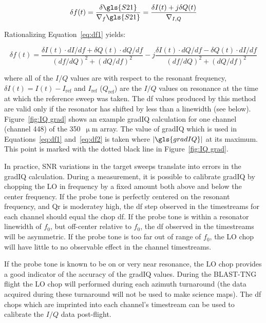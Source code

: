 \begin{equation}\label{eq:df1}
   \delta f(t) = \frac{\delta \gls{S21}}{\nabla_{f}\gls{S21}} = \frac{\delta I(t) + j\delta Q(t)}{\nabla_{I,Q}}
\end{equation}

Rationalizing Equation~\ref{eq:df1} yields:

\begin{equation}\label{eq:df2}
    \delta f(t) = \frac{\delta I(t) \cdot dI/df + \delta Q(t) \cdot dQ/df}{(df/dQ)^{2} + (dQ/df)^{2}} - j\frac{\delta I(t) \cdot dQ/df - \delta Q(t) \cdot dI/df}{(df/dQ)^{2} + (dQ/df)^{2}}
\end{equation}

where all of the $I/Q$ values are with respect to the resonant frequency, $\delta I(t) = I(t) - I_{\mathrm{ref}}$ and $I_{\mathrm{ref}}$ ($Q_{\mathrm{ref}}$) are the $I/Q$ values on resonance at the time at which the reference sweep was taken. The \gls{df} values produced by this method are valid only if the resonator has shifted by less than a linewidth (see below). Figure~\ref{fig:IQ grad} shows an example \gls{gradIQ} calculation for one channel (channel 448) of the 350~$\upmu$m array. The value of \gls{gradIQ} which is used in Equations~\ref{eq:df1} and~\ref{eq:df2} is taken where $\left| \gls{gradIQ} \right|$ at its maximum. This point is marked with the dotted black line in Figure~\ref{fig:IQ grad}.

In practice, SNR variations in the target sweeps translate into errors in the \gls{gradIQ} calculation. During a measurement, it is possible to calibrate \gls{gradIQ} by chopping the LO in frequency by a fixed amount both above and below the center frequency. If the probe tone is perfectly centered on the resonant frequency, and \gls{Qr} is moderatey high, the \gls{df} step observed in the timestreams for each channel should equal the chop \gls{df}. If the probe tone is within a resonator linewidth of $f_{0}$, but off-center relative to $f_{0}$, the \gls{df} observed in the timestreams will be asymmetric. If the probe tone is too far out of range of $f_{0}$, the LO chop will have little to no observable effect in the channel timestreams.

If the probe tone is known to be on or very near resonance, the LO chop provides a good indicator of the accuracy of the \gls{gradIQ} values. During the BLAST-TNG flight the LO chop will performed during each azimuth turnaround (the data acquired during these turnaround will not be used to make science maps). The \gls{df} chops which are imprinted into each channel's timestream can be used to calibrate the $I/Q$ data post-flight.

